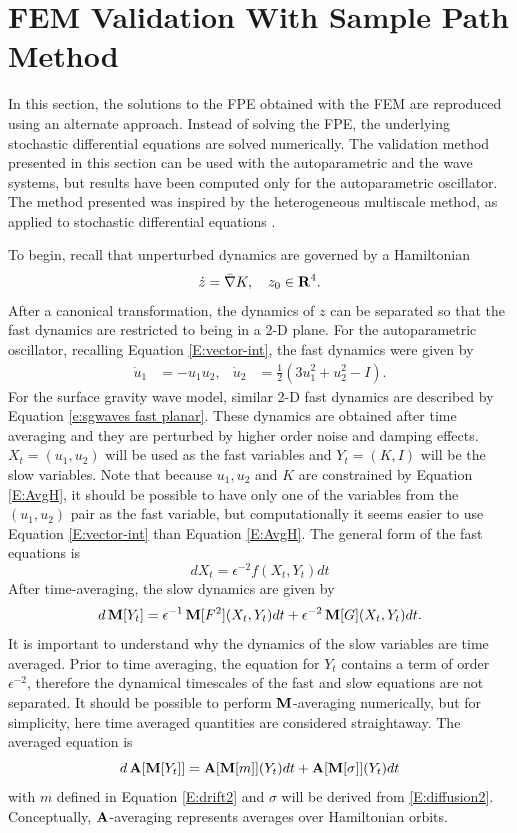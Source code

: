\section{FEM Validation With Sample Path Method}

In this section, the solutions to the FPE obtained with the FEM are reproduced using an alternate approach. Instead of solving the FPE, the underlying stochastic differential equations are solved numerically. The validation method presented in this section can be used with the autoparametric and the wave systems, but results have been computed only for the autoparametric oscillator. The method presented was inspired by the heterogeneous multiscale method, as applied to stochastic differential equations \citep{e05:_analy}.

To begin, recall that unperturbed dynamics are governed by a Hamiltonian
\[
\dot z = \bar \nabla K, \quad z_0 \in \mathbf R^4.
\]
After a canonical transformation, the dynamics of $z$ can be separated so that the fast dynamics are restricted to being in a 2-D plane. For the autoparametric oscillator, recalling Equation \eqref{E:vector-int}, the fast dynamics were given by
\begin{align*}
\dot u_1 &= - u_1 u_2, & \dot u_2 &= \frac12 (3 u_1^2 + u_2^2 - I).
\end{align*}
For the surface gravity wave model, similar 2-D fast dynamics are described by Equation \eqref{e:sgwaves fast planar}. These dynamics are obtained after time averaging and they are perturbed by higher order noise and damping effects. $X_t = (u_1,u_2)$ will be used as the fast variables and $Y_t = (K,I)$ will be the slow variables. Note that because $u_1, u_2$ and $K$ are constrained by Equation \eqref{E:AvgH}, it should be possible to have only one of the variables from the $(u_1,u_2)$ pair as the fast variable, but computationally it seems easier to use Equation \eqref{E:vector-int} than Equation \eqref{E:AvgH}. The general form of the fast equations is
\[
d X_t = \epsilon^{-2} f(X_t,Y_t) dt
\]
After time-averaging, the slow dynamics are given by
\begin{equation}
d \operatorname{\mathbf M}[Y_t] = \epsilon^{-1} \operatorname{\mathbf M}[F^2](X_t,Y_t) dt + \epsilon^{-2} \operatorname{\mathbf M}[G](X_t,Y_t) dt.
\end{equation}
It is important to understand why the dynamics of the slow variables are time averaged. Prior to time averaging, the equation for $Y_t$ contains a term of order $\epsilon^{-2}$, therefore the dynamical timescales of the fast and slow equations are not separated. It should be possible to perform $\operatorname{\mathbf M}$-averaging numerically, but for simplicity, here time averaged quantities are considered straightaway.
The averaged equation is
\begin{equation}
\label{e:averaged}
d\operatorname{\mathbf A}[\operatorname{\mathbf M}[Y_t]] = \operatorname{\mathbf A}[\operatorname{\mathbf M}[m]](Y_t) dt + \operatorname{\mathbf A}[\operatorname{\mathbf M}[\sigma]](Y_t) dt
\end{equation}
with $m$ defined in Equation \eqref{E:drift2} and $\sigma$ will be derived from \eqref{E:diffusion2}. Conceptually, $\operatorname{\mathbf A}$-averaging represents averages over Hamiltonian orbits.

